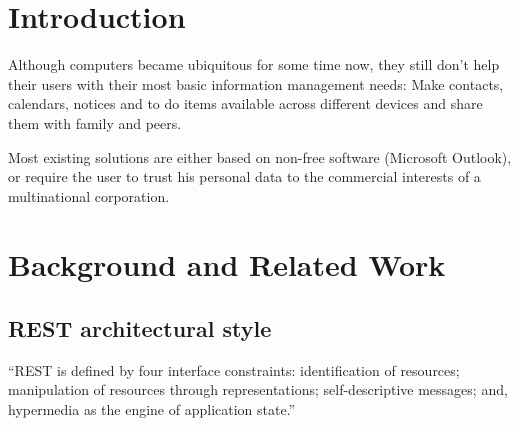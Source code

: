 \documentclass[12pt,a4paper,twoside]{scrartcl}		%
\newcommand{\citeurl}[2]{\url{#1} (#2)}
\begin{document}
\section{Introduction}
\label{sec:introduction}



Although computers became ubiquitous for some time now, they still don't help
their users with their most basic information management needs: Make contacts,
calendars, notices and to do items available across different devices and share
them with family and peers.

Most existing solutions are either based on non-free software (Microsoft Outlook),
or require the user to trust his personal data to the commercial
interests of a multinational corporation.

\section{Background and Related Work}
\label{sec:backgr-relat-work}

\subsection{REST architectural style}


\cite[sec. 5.1.5]{Fielding2000}

 ``REST is defined by four
  interface constraints: identification of resources; manipulation of resources
  through representations; self-descriptive messages; and, hypermedia as the
  engine of application state.''
\end{document}
